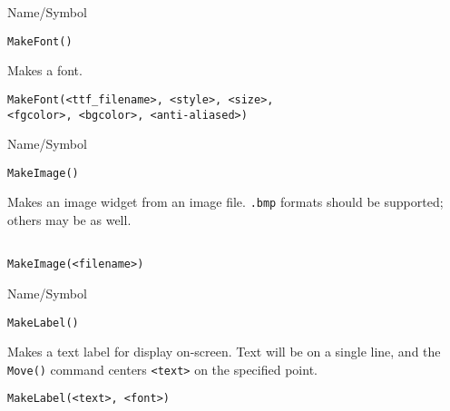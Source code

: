 \rl





\begin{desc}{Name/Symbol}
\item[Name/Symbol]	\verb+MakeFont()+

\item[Description]	Makes a font.

\item[Usage]
\begin{verbatim}
MakeFont(<ttf_filename>, <style>, <size>, 
<fgcolor>, <bgcolor>, <anti-aliased>)
\end{verbatim}

\item[Example]	

\item[See Also]	
\end{desc}

\rl



\begin{desc}{Name/Symbol}
\item[Name/Symbol]	\verb+MakeImage()+

\item[Description]	Makes an image widget from an image file.
		\texttt{.bmp} formats should be supported; others may be as well.

\item[Usage]		
\begin{verbatim}

MakeImage(<filename>)
\end{verbatim}

\item[Example]	

\item[See Also]	
\end{desc}

\rl




\begin{desc}{Name/Symbol}
\item[Name/Symbol]	\verb+MakeLabel()+

\item[Description] Makes a text label for display on-screen. Text will
  be on a single line, and the \verb+Move()+ command centers
  \verb+<text>+ on the specified point.

\item[Usage]
\begin{verbatim}
MakeLabel(<text>, <font>)
\end{verbatim}

\item[Example]	

\item[See Also]	
\end{desc}

